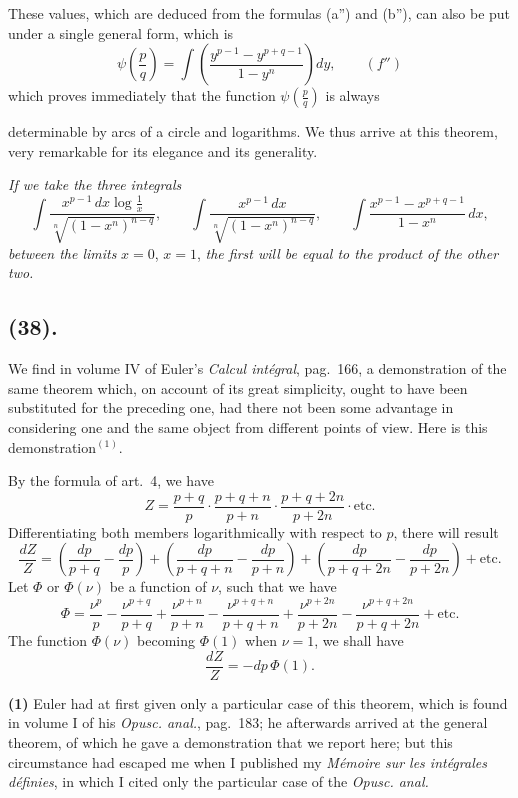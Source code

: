 \documentclass{article}
\begin{document}
These values, which are deduced from the formulas (a'') and (b''), can also be put under a single general form, which is
\[ \psi\left(\frac{p}{q}\right)=\int\left(\frac{y^{p-1}-y^{p+q-1}}{1-y^{n}}\right)dy,\qquad(f'') \]
which proves immediately that the function $\psi\left(\frac{p}{q}\right)$ is always

determinable by arcs of a circle and logarithms. We thus arrive at this theorem, very remarkable for its elegance and its generality.

\emph{If we take the three integrals}
\[ \int\frac{x^{p-1}\,dx\log\frac{1}{x}}{\sqrt[n]{(1-x^{n})^{n-q}}},\qquad\int\frac{x^{p-1}\,dx}{\sqrt[n]{(1-x^{n})^{n-q}}},\qquad\int\frac{x^{p-1}-x^{p+q-1}}{1-x^{n}}\,dx, \]
\emph{between the limits} $x=0$, $x=1$, \emph{the first will be equal to the product of the other two.}

\subsection*{(38).}

We find in volume IV of Euler's \emph{Calcul intégral}, pag.~166, a demonstration of the same theorem which, on account of its great simplicity, ought to have been substituted for the preceding one, had there not been some advantage in considering one and the same object from different points of view. Here is this demonstration${}^{(1)}$.

By the formula of art.~4, we have
\[ Z=\frac{p+q}{p}\cdot\frac{p+q+n}{p+n}\cdot\frac{p+q+2n}{p+2n}\cdot\text{etc.} \]
Differentiating both members logarithmically with respect to $p$, there will result
\[ \frac{dZ}{Z}=\left(\frac{dp}{p+q}-\frac{dp}{p}\right)+\left(\frac{dp}{p+q+n}-\frac{dp}{p+n}\right)+\left(\frac{dp}{p+q+2n}-\frac{dp}{p+2n}\right)+\text{etc.} \]
Let $\Phi$ or $\Phi(\nu)$ be a function of $\nu$, such that we have
\[ \Phi=\frac{\nu^{p}}{p}-\frac{\nu^{p+q}}{p+q}+\frac{\nu^{p+n}}{p+n}-\frac{\nu^{p+q+n}}{p+q+n}+\frac{\nu^{p+2n}}{p+2n}-\frac{\nu^{p+q+2n}}{p+q+2n}+\text{etc.} \]
The function $\Phi(\nu)$ becoming $\Phi(1)$ when $\nu=1$, we shall have
\[ \frac{dZ}{Z}=-dp\,\Phi(1). \]

\textbf{(1)} Euler had at first given only a particular case of this theorem, which is found in volume I of his \emph{Opusc. anal.}, pag.~183; he afterwards arrived at the general theorem, of which he gave a demonstration that we report here; but this circumstance had escaped me when I published my \emph{Mémoire sur les intégrales définies}, in which I cited only the particular case of the \emph{Opusc. anal.}
\end{document}

